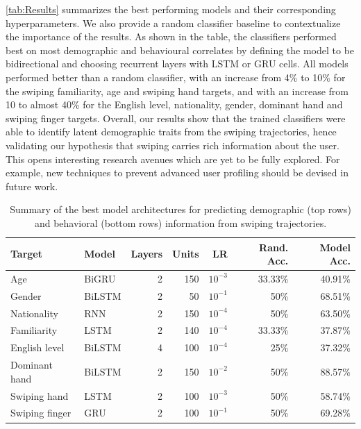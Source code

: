 \documentclass[sn-mathphys, pdflatex]{sn-jnl}
\begin{document}
\autoref{tab:Results} summarizes the best performing models and their corresponding hyperparameters.
We also provide a random classifier baseline to contextualize the importance of the results.
As shown in the table, the classifiers performed best on most demographic and behavioural correlates by defining the model to be bidirectional and choosing recurrent layers with LSTM or GRU cells. All models performed  better than a random classifier, with an increase from 4\% to 10\% for the swiping familiarity, age and swiping hand targets, and with an increase from 10 to almost 40\% for the English level, nationality, gender, dominant hand and swiping finger targets. Overall, our results show that the trained classifiers were able to identify latent demographic traits from the swiping trajectories, hence validating our hypothesis that swiping carries rich information about the user. This opens interesting research avenues which are yet to be fully explored. For example, new techniques to prevent advanced user profiling should be devised in future work.

\begin{table}[!ht]
\centering
\small
\setlength\tabcolsep{0.5em}
\begin{tabular}{ll *5r}
\toprule
\textbf{Target} & \textbf{Model} & \textbf{Layers} & \textbf{Units} & \textbf{LR} & \textbf{Rand. Acc.} & \textbf{Model Acc.} \\
\midrule
Age                 & BiGRU  & 2 & 150 & $10^{-3}$ & 33.33\% & 40.91\% \\
Gender              & BiLSTM & 2 & 50  & $10^{-1}$ & 50\%    & 68.51\% \\
Nationality         & RNN    & 2 & 150 & $10^{-4}$ & 50\%    & 63.50\% \\
\midrule
Familiarity         & LSTM   & 2 & 140 & $10^{-4}$ & 33.33\% & 37.87\% \\
English level       & BiLSTM & 4 & 100 & $10^{-4}$ & 25\%    & 37.32\% \\
Dominant hand       & BiLSTM & 2 & 150 & $10^{-2}$ & 50\%    & 88.57\% \\
Swiping hand        & LSTM   & 2 & 100 & $10^{-3}$ & 50\%    & 58.74\% \\
Swiping finger      & GRU    & 2 & 100 & $10^{-1}$ & 50\%    & 69.28\% \\
\bottomrule
\end{tabular}
\caption{Summary of the best model architectures for predicting demographic (top rows) and behavioral (bottom rows) information from swiping trajectories.}
\label{tab:Results}
\end{table}
\end{document}
